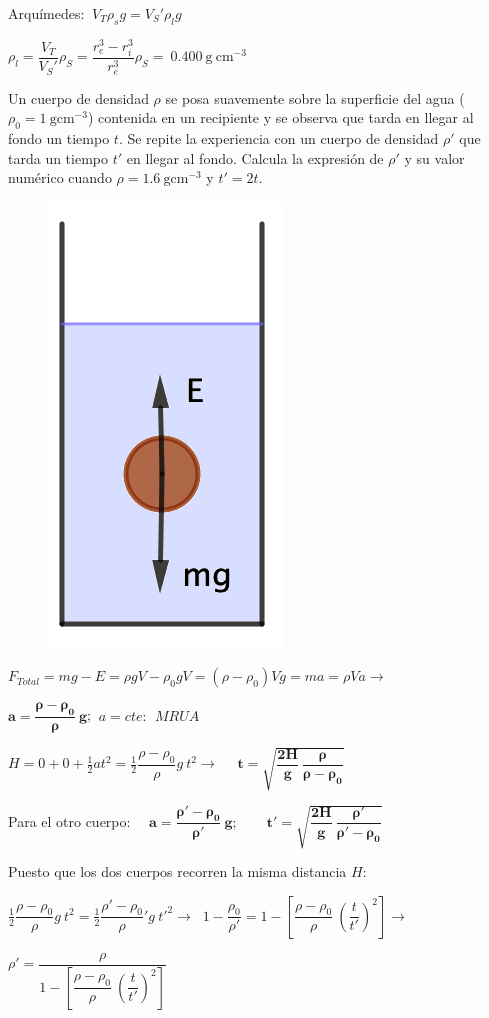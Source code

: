 Arquímedes: $\ V_T\rho_s g=V_S' \rho_l g$

$\rho_l=\dfrac{V_T}{V_S'}\rho_S=\dfrac{r_e^3-r_i^3}{r_e^3} \rho_S=\ 0.400 \ \mathrm{g\ cm}^{-3}$ 



\begin{prob}
\begin{multicols}{2}
Un cuerpo de densidad $\rho$ se posa suavemente sobre la superficie del agua \textcolor{gris}{($\rho_0=1\ \mathrm{gcm}^{-3}$)} contenida en un recipiente y se observa que tarda en llegar al fondo un tiempo $t$. Se repite la experiencia con un cuerpo de densidad $\rho'$ que tarda un tiempo $t'$ en llegar al fondo. Calcula la expresión de $\rho'$ y su valor numérico cuando $\rho=1.6 \ \mathrm{gcm}^{-3}$ y $t'=2t$.
\begin{figure}[H]
	\centering
	\includegraphics[width=.15\textwidth]{imagenes/imagenes09/T09IM10.png}
\end{figure}	
\end{multicols}
\end{prob}


$F_{Total}=mg-E=\rho g V-\rho_0gV=(\rho-\rho_0)Vg=ma=\rho V a \to $

$\boldsymbol{ a=\dfrac{\rho-\rho_0}{\rho}\ g}$; $\ a=cte:\ \ MRUA$

$H=0+0+\frac 1 2 a t^2=\frac 1 2 \dfrac{\rho-\rho_0}\rho g \ t^2 
\to$
$\quad \boldsymbol{ t=\sqrt{\dfrac {2H}{g}\ \dfrac{\rho}{\rho-\rho_0}} }$


Para el otro cuerpo: $\quad \boldsymbol{a=\dfrac{\rho'-\rho_0}{\rho'}\ g} ; \qquad \boldsymbol{t'=\sqrt{\dfrac {2H}{g}\ \dfrac{\rho'}{\rho'-\rho_0}}}$

Puesto que los dos cuerpos recorren la misma distancia $H$:

$\frac 1 2 \dfrac{\rho-\rho_0}\rho g \ {t}^2=
\frac 1 2 \dfrac{\rho'-\rho_0}\rho' g \ {t'}^2 \to $
$\ 1-\dfrac {\rho_0}{\rho'}=1-\left[\dfrac{\rho-\rho_0}{\rho} \ \left(\dfrac{t}{t'} \right)^2\right] \to \ $

$\boxed{\rho'=\dfrac{\rho}{1-\left[\dfrac{\rho-\rho_0}{\rho} \ \left(\dfrac{t}{t'} \right)^2\right]}}$

